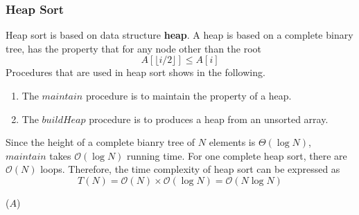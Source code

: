 \documentclass[catalog.tex]{subfiles}
\begin{document}
\subsubsection{Heap Sort}
Heap sort is based on data structure \textbf{heap}. A heap is based on a complete binary tree, has the property that for any node other than the root~\cite{intro3rd}
$$
	A[\lfloor i / 2\rfloor] \leq A[i]
$$
Procedures that are used in heap sort shows in the following.~\cite{ve281}
\begin{enumerate}
	\item The $maintain$ procedure is to maintain the property of a heap. 
	\item The $buildHeap$ procedure is to produces a heap from an unsorted array.
\end{enumerate}
Since the height of a complete bianry tree of $N$ elements is $\Theta(\log N)$, $maintain$ takes $\mathcal{O}(\log N)$ running time. For one complete heap sort, there are $\mathcal{O}(N)$ loops. Therefore, the time complexity of heap sort can be expressed as
$$
	T(N) = \mathcal{O}(N) \times \mathcal{O}(\log N) = \mathcal{O}(N\log N)
$$

\begin{Algorithm}[$heapSort(A)$\label{alg:\currfilebase_d}]
	\BlankLine
	
	\anotherfunction($A$) \\
	\Ret


\end{Algorithm}
\newpage
\end{document}
